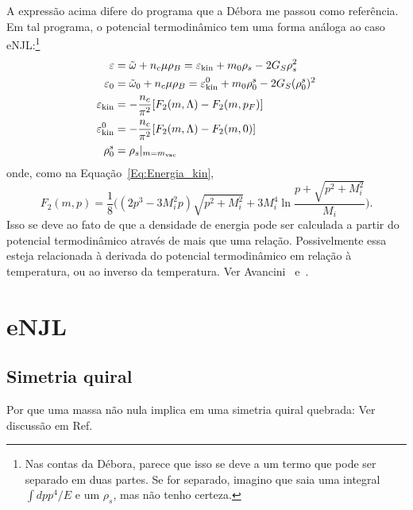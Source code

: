 A expressão acima difere do programa que a Débora me passou como referência. Em tal programa, o potencial termodinâmico tem uma forma análoga ao caso eNJL:\footnote{Nas contas da Débora, parece que isso se deve a um termo que pode ser separado em duas partes. Se for separado, imagino que saia uma integral $\int dp p^4/E$ e um $\rho_s$, mas não tenho certeza.}
\begin{subequations}\label{Eq:Pot_termodinamico_2}
\begin{align}
	\varepsilon &= \tilde{\omega} + n_c\mu\rho_B = \varepsilon_{\rm{kin}} + m_0\rho_s - 2G_S\rho_s^2 \\
	\varepsilon_0 &= \tilde{\omega}_0 + n_c\mu\rho_B = \varepsilon_{\rm{kin}}^0 + m_0\rho_0^s - 2G_S(\rho_0^s)^2 \\
	\varepsilon_{\rm{kin}} &= -\frac{n_c}{\pi^2} [F_2(m, \Lambda) - F_2(m, p_F)] \\
	\varepsilon_{\rm{kin}}^0 &= -\frac{n_c}{\pi^2} [F_2(m, \Lambda) - F_2(m, 0)] \\
	\rho_0^s &= \rho_s|_{m = m_{\rm{vac}}}
\end{align}
\end{subequations}
%
onde, como na Equação~\eqref{Eq:Energia_kin},
\begin{equation}
	F_2(m, p) = \frac{1}{8}\Big((2p^3 - 3M_i^2p)\sqrt{p^2 + M_i^2} + 3M_i^4\ln\frac{p + \sqrt{p^2 + M_i^2}}{M_i}\Big).
\end{equation}
%
Isso se deve ao fato de que a densidade de energia pode ser calculada a partir do potencial termodinâmico através de mais que uma relação. Possivelmente essa esteja relacionada à derivada do potencial termodinâmico em relação à temperatura, ou ao inverso da temperatura. Ver Avancini~\cite{Avancini2004} e~\cite{Avancini2006}.



\chapter{eNJL}

\section{Simetria quiral}

Por que uma massa não nula implica em uma simetria quiral quebrada: Ver discussão em Ref.\cite{Vogl}

